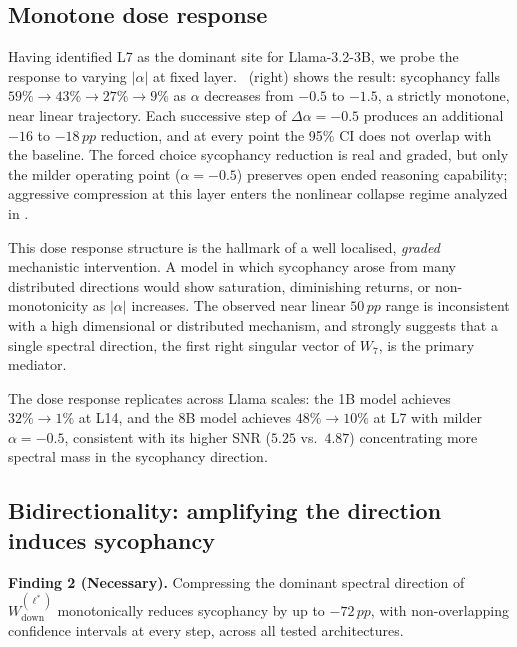 \documentclass{article}
\newcommand{\pp}{\,pp}
\begin{document}
\subsection{Monotone dose response}
\label{sec:doseresponse}

Having identified L7 as the dominant site for Llama-3.2-3B, we probe
the response to varying $|\alpha|$ at fixed layer.
~(right) shows the result: sycophancy falls
$59\%\!\to\!43\%\!\to\!27\%\!\to\!9\%$ as $\alpha$ decreases from
$-0.5$ to $-1.5$, a strictly monotone, near linear trajectory. Each
successive step of $\Delta\alpha = -0.5$ produces an additional
$-16$ to $-18\pp$ reduction, and at every point the 95\% CI does not
overlap with the baseline. The forced choice sycophancy reduction is
real and graded, but only the milder operating point ($\alpha{=}{-}0.5$)
preserves open ended reasoning capability; aggressive compression at
this layer enters the nonlinear collapse regime analyzed in
.

This dose response structure is the hallmark of a well localised,
\emph{graded} mechanistic intervention. A model in which sycophancy
arose from many distributed directions would show saturation,
diminishing returns, or non-monotonicity as $|\alpha|$ increases. The
observed near linear $50\pp$ range is inconsistent with a
high dimensional or distributed mechanism, and strongly suggests that
a single spectral direction, the first right singular vector of
$W_7$, is the primary mediator.

The dose response replicates across Llama scales: the 1B model achieves
$32\%\!\to\!1\%$ at L14, and the 8B model achieves $48\%\!\to\!10\%$ at
L7 with milder $\alpha{=}{-}0.5$, consistent with its higher SNR ($5.25$
vs.\ $4.87$) concentrating more spectral mass in the sycophancy direction.

\subsection{Bidirectionality: amplifying the direction induces sycophancy}
\label{sec:amplify}

\begin{findingbox}
\textbf{Finding 2 (Necessary).}
Compressing the dominant spectral direction of
$W_\mathrm{down}^{(\ell^{*})}$ monotonically reduces sycophancy by up
to $-72\pp$, with non-overlapping confidence intervals at every step,
across all tested architectures.
\end{findingbox}
\end{document}
